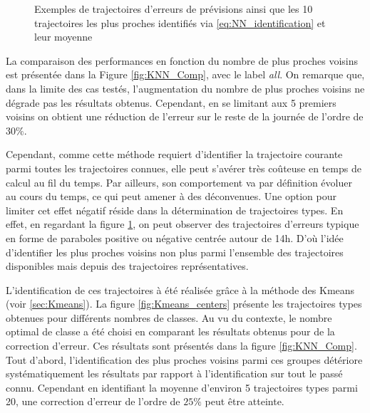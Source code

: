 \documentclass[12pt]{report}
\begin{document}
\begin{figure}[h]
\begin{subfigure}[b]{0.5\linewidth}
	\end{subfigure}%
	
	\caption{Exemples de trajectoires d'erreurs de prévisions ainsi que les 10 trajectoires les plus proches identifiés via \eqref{eq:NN_identification} et leur moyenne}
	\label{fig:KNN_Intraday_scenarios} 
\end{figure}


La comparaison des performances en fonction du nombre de plus proches voisins est présentée dans la Figure \ref{fig:KNN_Comp}, avec le label \textit{all}. On remarque que, dans la limite des cas testés, l'augmentation du nombre de plus proches voisins ne dégrade pas les résultats obtenus. Cependant, en se limitant aux 5 premiers voisins on obtient une réduction de l'erreur sur le reste de la journée de l'ordre de $30\%$.

Cependant, comme cette méthode requiert d'identifier la trajectoire courante parmi toutes les trajectoires connues, elle peut s'avérer très coûteuse en temps de calcul au fil du temps. Par ailleurs, son comportement va par définition évoluer au cours du temps, ce qui peut amener à des déconvenues. Une option pour limiter cet effet négatif réside dans la détermination de trajectoires types. En effet, en regardant la figure \ref{fig:KNN_Intraday_scenarios}, on peut observer des trajectoires d'erreurs typique en forme de paraboles positive ou négative centrée autour de 14h. D'où l'idée d'identifier les plus proches voisins non plus parmi l'ensemble des trajectoires disponibles mais depuis des trajectoires représentatives.

L'identification de ces trajectoires à été réalisée grâce à la méthode des Kmeans (voir \ref{sec:Kmeans}). La figure \ref{fig:Kmeans_centers} présente les trajectoires types obtenues pour différents nombres de classes. Au vu du contexte, le nombre optimal de classe a été choisi en comparant les résultats obtenus pour de la correction d'erreur. Ces résultats sont présentés dans la figure \ref{fig:KNN_Comp}. Tout d'abord, l'identification des plus proches voisins parmi ces groupes détériore systématiquement les résultats par rapport à l'identification sur tout le passé connu. Cependant en identifiant la moyenne d'environ 5 trajectoires types parmi 20, une correction d'erreur de l'ordre de $25 \%$ peut être atteinte.
\end{document}
